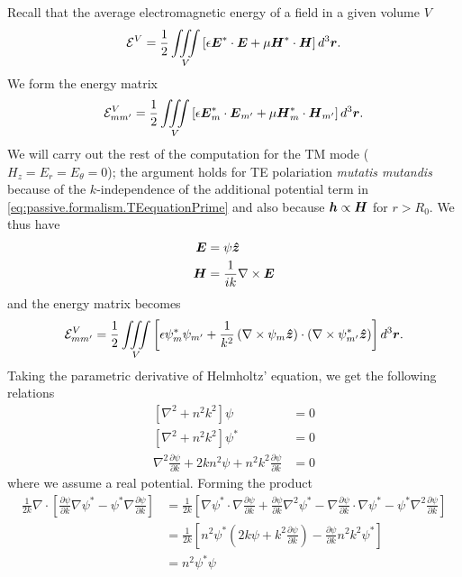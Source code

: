 Recall that the average electromagnetic energy of a field
in a given volume $V$
  \begin{equation}
   \mathcal{E}^V = \frac{1}{2}\mathop{\iiint}_V\left[\epsilon\boldsymbol{E}^*\cdot\boldsymbol{E}+\mu\boldsymbol{H}^*\cdot\boldsymbol{H}\right]d^3\boldsymbol{r}.
  \end{equation}
We form the energy matrix 
  \begin{equation}
   \mathcal{E}^V_{mm'} = \frac{1}{2}\mathop{\iiint}_V\left[\epsilon\boldsymbol{E}^*_m\cdot\boldsymbol{E}_{m'}+\mu\boldsymbol{H}^*_m\cdot\boldsymbol{H}_{m'}\right]d^3\boldsymbol{r}.
  \end{equation}
We will carry out the rest of the computation for the TM mode ($H_z=E_r=E_\theta=0$);
the argument holds for TE polariation \textit{mutatis mutandis} because of the
$k$-independence of the additional potential term in \eqref{eq:passive.formalism.TEequationPrime}
and also because $\boldsymbol{h}\propto\boldsymbol{H}$ for $r>R_0$. We thus have 
  \begin{align*}
    \boldsymbol{E}	&= \psi\boldsymbol{\hat{z}}	\\
    \boldsymbol{H}	&= \frac{1}{ik}\nabla\times\boldsymbol{E}
  \end{align*}
and the energy matrix becomes
\begin{align}
    \mathcal{E}^V_{mm'}	&= \frac{1}{2}\mathop{\iiint}_V\left[\epsilon\psi^*_{m}\psi_{m'}+\frac{1}{k^2}\left(\nabla\times\psi_{m}\boldsymbol{\hat{z}}\right)\cdot\left(\nabla\times\psi^*_{m'}\boldsymbol{\hat{z}}\right)\right]d^3\boldsymbol{r}.	\nonumber\\
  \end{align}
Taking the parametric derivative of Helmholtz' equation, we get the 
following relations
  \begin{subequations}
  \label{eq:passive.formalism.parametricHelmholtz}
  \begin{align}
   \left[\nabla^2+n^2k^2\right]\psi								&=0	\\
   \left[\nabla^2+n^2k^2\right]\psi^*								&=0	\\
   \nabla^2\frac{\partial\psi}{\partial k}+2kn^2\psi+n^2k^2\frac{\partial\psi}{\partial k}	&=0
  \end{align}
  \end{subequations}
where we assume a real potential.
Forming the product
  \begin{align*}
   \frac{1}{2k}\nabla\cdot\left[\frac{\partial\psi}{\partial k}\nabla\psi^*-\psi^*\nabla\frac{\partial\psi}{\partial k}\right]
	&= \frac{1}{2k}\left[\nabla\psi^*\cdot\nabla\frac{\partial\psi}{\partial k}+\frac{\partial\psi}{\partial k}\nabla^2\psi^*
			  -\nabla\frac{\partial\psi}{\partial k}\cdot\nabla\psi^*-\psi^*\nabla^2\frac{\partial\psi}{\partial k}\right]	\\
	&= \frac{1}{2k}\left[n^2\psi^*\left(2k\psi+k^2\frac{\partial\psi}{\partial k}\right)-\frac{\partial\psi}{\partial k}n^2k^2\psi^*\right]\\
	&= n^2\psi^*\psi
  \end{align*}
